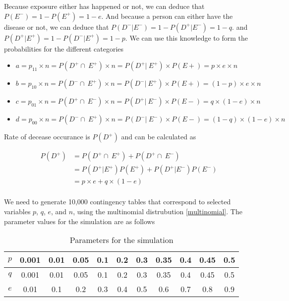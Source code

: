 Because exposure either has happened or not, we can deduce that $P(E^-) = 1 - P(E^+) = 1 - e.$ And because a person can either have the disease or not, we can deduce that $P(D^- |E^-) = 1 - P(D^+ |E^-) = 1 - q.$ and $P(D^+ |E^+) = 1 - P(D^- |E^+) = 1 - p$. We can use this knowledge to form the probabilities for the different categories

\begin{itemize}\label{pqeParams}
    \item $a = p_{11} \times n = P(D^+ \cap\ E^+) \times n = P(D^+ |\ E^+) \times P(E+) = p \times e \times n$
    \item $b = p_{10} \times n = P(D^- \cap\ E^+) \times n = P(D^- |\ E^+) \times P(E+) = (1 - p) \times e \times n$
    \item $c = p_{01} \times n = P(D^+ \cap\ E^-) \times n = P(D^+ |\ E^-) \times P(E-) = q \times (1 - e) \times n$
    \item $d = p_{00} \times n = P(D^- \cap\ E^+) \times n = P(D^- |\ E^-) \times P(E-) = (1 - q) \times (1 - e) \times n$
\end{itemize}

Rate of decease occurance is $P(D^+)$ and can be calculated as

\begin{equation}
    \begin{split}
    P(D^+) &= P(D^+ \cap\ E^+) + P(D^+ \cap\ E^-) \\
           &= P(D^+ | E^+)P(E^+) + P(D^+ | E^-)P(E^-)  \\
           &= p \times e + q \times (1 - e) \\
    \end{split}
\end{equation}

We need to generate 10,000 contingency tables that correspond to selected variables $p$, $q$, $e$, and $n$, using the multinomial distrubution \ref{multinomial}. The parameter values for the simulation are as follows

\begin{table}[h!] \label{simulationParams}
    \centering
    \caption{Parameters for the simulation}
    \label{sample-parameters}
    \begin{tabular}{|c|c|c|c|c|c|c|c|c|c|c|}
    \hline
    $p$ & 0.001 & 0.01  & 0.05 & 0.1  & 0.2  & 0.3  & 0.35 & 0.4  & 0.45  & 0.5   \\ \hline
    $q$ & 0.001 & 0.01  & 0.05 & 0.1  & 0.2  & 0.3  & 0.35 & 0.4  & 0.45  & 0.5   \\ \hline
    $e$ & 0.01  & 0.1   & 0.2  & 0.3  & 0.4  & 0.5  & 0.6  & 0.7  & 0.8   & 0.9   \\ \hline
    \end{tabular}
\end{table}

